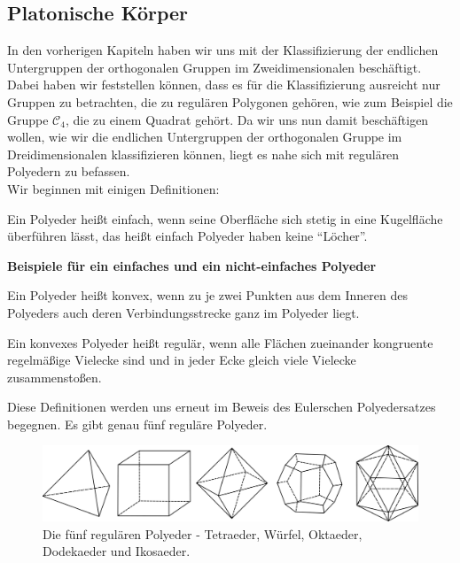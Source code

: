 \subsection{Platonische Körper}
In den vorherigen Kapiteln haben wir uns mit der Klassifizierung der endlichen Untergruppen der orthogonalen Gruppen im Zweidimensionalen beschäftigt. Dabei haben wir feststellen können, dass es für die Klassifizierung ausreicht nur Gruppen zu betrachten, die zu regulären Polygonen gehören, wie zum Beispiel die Gruppe $\mathcal{C}_4$, die zu einem Quadrat gehört. Da wir uns nun damit beschäftigen wollen, wie wir die endlichen Untergruppen der orthogonalen Gruppe im Dreidimensionalen klassifizieren können, liegt es nahe sich mit regulären Polyedern zu befassen.\\
Wir beginnen mit einigen Definitionen: 
\begin{defi}
	Ein Polyeder heißt einfach, wenn seine Oberfläche sich stetig in eine Kugelfläche überführen lässt, das heißt einfach Polyeder haben keine \enquote{Löcher}. \citep[211]{Mainzer1988}
\end{defi}
\textbf{Beispiele für ein einfaches und ein nicht-einfaches Polyeder}
\begin{defi}
	Ein Polyeder heißt konvex, wenn zu je zwei Punkten aus dem Inneren des Polyeders auch deren Verbindungsstrecke ganz im Polyeder liegt. \citep[51]{Mueller2012}
\end{defi}
\begin{defi}
	Ein konvexes Polyeder heißt regulär, wenn alle Flächen zueinander kongruente regelmäßige Vielecke sind und in jeder Ecke gleich viele Vielecke zusammenstoßen. \citep[51]{Mueller2012}
\end{defi}
Diese Definitionen werden uns erneut im Beweis des Eulerschen Polyedersatzes begegnen. Es gibt genau fünf reguläre Polyeder.\\
\begin{figure}[H]
    \centering
    \includegraphics[width=0.9\linewidth]{grafiken/platonische_koerper.pdf}
    \caption{Die fünf regulären Polyeder - Tetraeder, Würfel, Oktaeder, Dodekaeder und Ikosaeder.}
    \label{fig:grafiken/platonische_koerper}
\end{figure}
